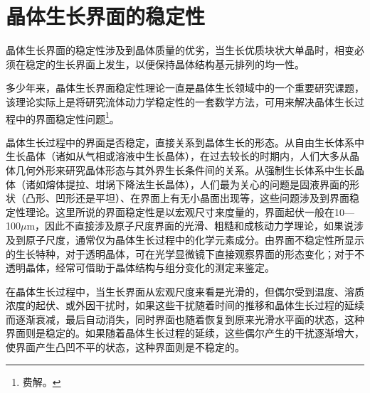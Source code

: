 \section{晶体生长界面的稳定性}
晶体生长界面的稳定性涉及到晶体质量的优劣，当生长优质块状大单晶时，相变必须在稳定的生长界面上发生，以便保持晶体结构基元排列的均一性。

多少年来，晶体生长界面稳定性理论一直是晶体生长领域中的一个重要研究课题，该理论实际上是将研究流体动力学稳定性的一套数学方法，可用来解决晶体生长过程中的界面稳定性问题\footnote{费解。}。

晶体生长过程中的界面是否稳定，直接关系到晶体生长的形态。从自由生长体系中生长晶体（诸如从气相或溶液中生长晶体），在过去较长的时期内，人们大多从晶体几何外形来研究晶体形态与其外界生长条件间的关系。从强制生长体系中生长晶体（诸如熔体提拉、坩埚下降法生长晶体），人们最为关心的问题是固液界面的形状（凸形、凹形还是平坦）、在界面上有无小晶面出现等，这些问题涉及到界面稳定性理论。这里所说的界面稳定性是以宏观尺寸来度量的，界面起伏一般在10---100$\mu$m，因此不直接涉及原子尺度界面的光滑、粗糙和成核动力学理论，如果说涉及到原子尺度，通常仅为晶体生长过程中的化学元素成分。由界面不稳定性所显示的生长特种，对于透明晶体，可在光学显微镜下直接观察界面的形态变化；对于不透明晶体，经常可借助于晶体结构与组分变化的测定来鉴定。

在晶体生长过程中，当生长界面从宏观尺度来看是光滑的，但偶尔受到温度、溶质浓度的起伏、或外因干扰时，如果这些干扰随着时间的推移和晶体生长过程的延续而逐渐衰减，最后自动消失，同时界面也随着恢复到原来光滑水平面的状态，这种界面则是稳定的。如果随着晶体生长过程的延续，这些偶尔产生的干扰逐渐增大，使界面产生凸凹不平的状态，这种界面则是不稳定的。


\clearpage